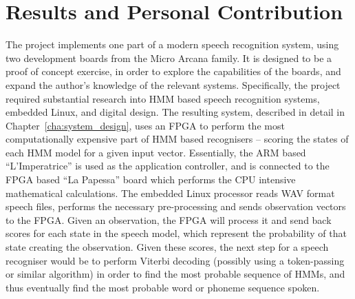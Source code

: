 \section{Results and Personal Contribution} %
\label{sec:contributions}
	The project implements one part of a modern speech recognition system, using two development boards from the Micro Arcana family.  It is designed to be a proof of concept exercise, in order to explore the capabilities of the boards, and expand the author's knowledge of the relevant systems.  Specifically, the project required substantial research into HMM based speech recognition systems, embedded Linux, and digital design.  The resulting system, described in detail in Chapter~\ref{cha:system_design}, uses an FPGA to perform the most computationally expensive part of HMM based recognisers -- scoring the states of each HMM model for a given input vector.  Essentially, the ARM based ``L'Imperatrice'' is used as the application controller, and is connected to the FPGA based ``La Papessa'' board which performs the CPU intensive mathematical calculations.  The embedded Linux processor reads WAV format speech files, performs the necessary pre-processing and sends observation vectors to the FPGA.  Given an observation, the FPGA will process it and send back scores for each state in the speech model, which represent the probability of that state creating the observation.  Given these scores, the next step for a speech recogniser would be to perform Viterbi decoding (possibly using a token-passing or similar algorithm) in order to find the most probable sequence of HMMs, and thus eventually find the most probable word or phoneme sequence spoken.



